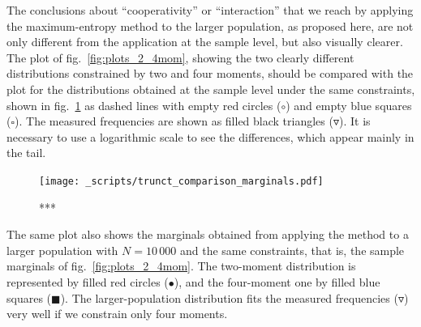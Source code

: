 \documentclass[\ifafour a4paper,12pt,\else a5paper,10pt,\fi%
onecolumn,oneside,article,%
british%
]{memoir}
\theoremstyle{remark}
\theoremstyle{innote}
\renewcommand*{\|}{\nonscript\,\vert\nonscript\;\mathopen{}}
\newcommand*{\fig}{fig.}%
\begin{document}
The conclusions about \enquote{cooperativity} or \enquote{interaction}
that we reach by applying the maximum-entropy method to the larger population,
as proposed here, are not only different from the application at the sample
level, but also visually clearer. The plot of \fig~\ref{fig:plots_2_4mom},
showing the two clearly different distributions constrained by two and four
moments, should be compared with the plot for the distributions obtained at
the sample level under the same constraints, shown in
\fig~\ref{fig:comparisons_marginals} as dashed lines with empty red
circles (\textcolor{myred}{\LARGE$\bm{\mathord{\circ}}$}) and empty blue
squares (\textcolor{mypurpleblue}{$\bm{\square}$}). The measured
frequencies are shown as filled black triangles
(\textcolor{black}{$\bm{\triangledown}$}). It is necessary to use a
logarithmic scale to see the differences, which appear mainly in the tail.
\begin{figure}[!b]
\centering
\texttt{[image: \_scripts/trunct\_comparison\_marginals.pdf]}%
\caption{***}
\label{fig:comparisons_marginals}
\end{figure}

The same plot also shows the marginals obtained from applying the method to
a larger population with $N=10\,000$ and the same constraints, that is, the
sample marginals of \fig~\ref{fig:plots_2_4mom}. The two-moment
distribution is represented by filled red circles
(\textcolor{myred}{\LARGE$\bm{\bullet}$}), and the four-moment one by
filled blue squares (\textcolor{mypurpleblue}{$\bm{\blacksquare}$}). The
larger-population distribution fits the measured frequencies
(\textcolor{black}{$\bm{\triangledown}$}) very well if we constrain only four
moments.
\end{document}
